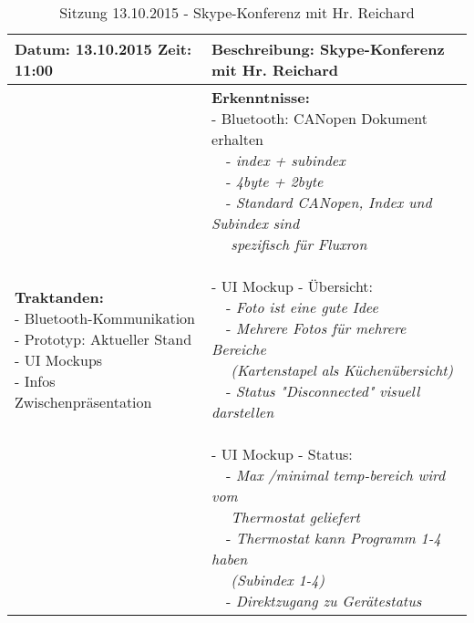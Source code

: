 \begin{table}[H]
\begin{tabularx}{\textwidth}{| l | X |}
\hline
\textbf{Datum:} 13.10.2015
\textbf{Zeit:} 11:00
&
\textbf{Beschreibung:} Skype-Konferenz mit Hr. Reichard \\ \hline
\specialcell[t]{
\textbf{Traktanden:}\\
- Bluetooth-Kommunikation\\
- Prototyp: Aktueller Stand\\
- UI Mockups\\
- Infos Zwischenpräsentation\\
}
& 
\specialcell[t]{
\textbf{Erkenntnisse:}\\
- Bluetooth: CANopen Dokument erhalten\\
~~- \textit{index + subindex}\\
~~- \textit{4byte + 2byte}\\
~~- \textit{Standard CANopen, Index und Subindex sind}\\~~ \textit{spezifisch für Fluxron}\\
\\
- UI Mockup - Übersicht:\\
~~- \textit{Foto ist eine gute Idee}\\
~~- \textit{Mehrere Fotos für mehrere Bereiche}\\~~ \textit{(Kartenstapel als Küchenübersicht)}\\
~~- \textit{Status "Disconnected" visuell darstellen}\\
\\
- UI Mockup - Status:\\
~~- \textit{Max /minimal temp-bereich wird vom}\\~~ \textit{Thermostat geliefert}\\
~~- \textit{Thermostat kann Programm 1-4 haben}\\~~ \textit{(Subindex 1-4)}\\
~~- \textit{Direktzugang zu Gerätestatus}\\
}
\\ \hline
\end{tabularx}
\caption{Sitzung 13.10.2015 - Skype-Konferenz mit Hr. Reichard}
\end{table}